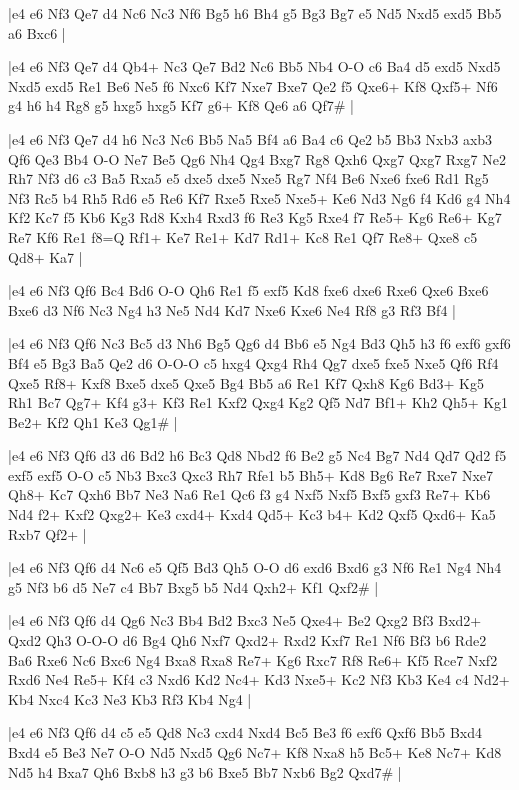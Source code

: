 \whitename{}
\blackname{}
\makegametitle
|e4 e6 Nf3 Qe7 d4 Nc6 Nc3 Nf6 Bg5 h6 Bh4 g5 Bg3 Bg7 e5 Nd5 Nxd5 exd5 Bb5 a6 Bxc6  |

\whitename{}
\blackname{}
\makegametitle
|e4 e6 Nf3 Qe7 d4 Qb4+ Nc3 Qe7 Bd2 Nc6 Bb5 Nb4 O-O c6 Ba4 d5 exd5 Nxd5 Nxd5 exd5 Re1 Be6 Ne5 f6 Nxc6 Kf7 Nxe7 Bxe7 Qe2 f5 Qxe6+ Kf8 Qxf5+ Nf6 g4 h6 h4 Rg8 g5 hxg5 hxg5 Kf7 g6+ Kf8 Qe6 a6 Qf7\#  |

\whitename{}
\blackname{}
\makegametitle
|e4 e6 Nf3 Qe7 d4 h6 Nc3 Nc6 Bb5 Na5 Bf4 a6 Ba4 c6 Qe2 b5 Bb3 Nxb3 axb3 Qf6 Qe3 Bb4 O-O Ne7 Be5 Qg6 Nh4 Qg4 Bxg7 Rg8 Qxh6 Qxg7 Qxg7 Rxg7 Ne2 Rh7 Nf3 d6 c3 Ba5 Rxa5 e5 dxe5 dxe5 Nxe5 Rg7 Nf4 Be6 Nxe6 fxe6 Rd1 Rg5 Nf3 Rc5 b4 Rh5 Rd6 e5 Re6 Kf7 Rxe5 Rxe5 Nxe5+ Ke6 Nd3 Ng6 f4 Kd6 g4 Nh4 Kf2 Kc7 f5 Kb6 Kg3 Rd8 Kxh4 Rxd3 f6 Re3 Kg5 Rxe4 f7 Re5+ Kg6 Re6+ Kg7 Re7 Kf6 Re1 f8=Q Rf1+ Ke7 Re1+ Kd7 Rd1+ Kc8 Re1 Qf7 Re8+ Qxe8 c5 Qd8+ Ka7  |

\whitename{}
\blackname{}
\makegametitle
|e4 e6 Nf3 Qf6 Bc4 Bd6 O-O Qh6 Re1 f5 exf5 Kd8 fxe6 dxe6 Rxe6 Qxe6 Bxe6 Bxe6 d3 Nf6 Nc3 Ng4 h3 Ne5 Nd4 Kd7 Nxe6 Kxe6 Ne4 Rf8 g3 Rf3 Bf4  |

\whitename{}
\blackname{}
\makegametitle
|e4 e6 Nf3 Qf6 Nc3 Bc5 d3 Nh6 Bg5 Qg6 d4 Bb6 e5 Ng4 Bd3 Qh5 h3 f6 exf6 gxf6 Bf4 e5 Bg3 Ba5 Qe2 d6 O-O-O c5 hxg4 Qxg4 Rh4 Qg7 dxe5 fxe5 Nxe5 Qf6 Rf4 Qxe5 Rf8+ Kxf8 Bxe5 dxe5 Qxe5 Bg4 Bb5 a6 Re1 Kf7 Qxh8 Kg6 Bd3+ Kg5 Rh1 Bc7 Qg7+ Kf4 g3+ Kf3 Re1 Kxf2 Qxg4 Kg2 Qf5 Nd7 Bf1+ Kh2 Qh5+ Kg1 Be2+ Kf2 Qh1 Ke3 Qg1\#  |

\whitename{}
\blackname{}
\makegametitle
|e4 e6 Nf3 Qf6 d3 d6 Bd2 h6 Bc3 Qd8 Nbd2 f6 Be2 g5 Nc4 Bg7 Nd4 Qd7 Qd2 f5 exf5 exf5 O-O c5 Nb3 Bxc3 Qxc3 Rh7 Rfe1 b5 Bh5+ Kd8 Bg6 Re7 Rxe7 Nxe7 Qh8+ Kc7 Qxh6 Bb7 Ne3 Na6 Re1 Qc6 f3 g4 Nxf5 Nxf5 Bxf5 gxf3 Re7+ Kb6 Nd4 f2+ Kxf2 Qxg2+ Ke3 cxd4+ Kxd4 Qd5+ Kc3 b4+ Kd2 Qxf5 Qxd6+ Ka5 Rxb7 Qf2+  |

\whitename{}
\blackname{}
\makegametitle
|e4 e6 Nf3 Qf6 d4 Nc6 e5 Qf5 Bd3 Qh5 O-O d6 exd6 Bxd6 g3 Nf6 Re1 Ng4 Nh4 g5 Nf3 b6 d5 Ne7 c4 Bb7 Bxg5 b5 Nd4 Qxh2+ Kf1 Qxf2\#  |

\whitename{}
\blackname{}
\makegametitle
|e4 e6 Nf3 Qf6 d4 Qg6 Nc3 Bb4 Bd2 Bxc3 Ne5 Qxe4+ Be2 Qxg2 Bf3 Bxd2+ Qxd2 Qh3 O-O-O d6 Bg4 Qh6 Nxf7 Qxd2+ Rxd2 Kxf7 Re1 Nf6 Bf3 b6 Rde2 Ba6 Rxe6 Nc6 Bxc6 Ng4 Bxa8 Rxa8 Re7+ Kg6 Rxc7 Rf8 Re6+ Kf5 Rce7 Nxf2 Rxd6 Ne4 Re5+ Kf4 c3 Nxd6 Kd2 Nc4+ Kd3 Nxe5+ Kc2 Nf3 Kb3 Ke4 c4 Nd2+ Kb4 Nxc4 Kc3 Ne3 Kb3 Rf3 Kb4 Ng4  |

\whitename{}
\blackname{}
\makegametitle
|e4 e6 Nf3 Qf6 d4 c5 e5 Qd8 Nc3 cxd4 Nxd4 Bc5 Be3 f6 exf6 Qxf6 Bb5 Bxd4 Bxd4 e5 Be3 Ne7 O-O Nd5 Nxd5 Qg6 Nc7+ Kf8 Nxa8 h5 Bc5+ Ke8 Nc7+ Kd8 Nd5 h4 Bxa7 Qh6 Bxb8 h3 g3 b6 Bxe5 Bb7 Nxb6 Bg2 Qxd7\#  |

